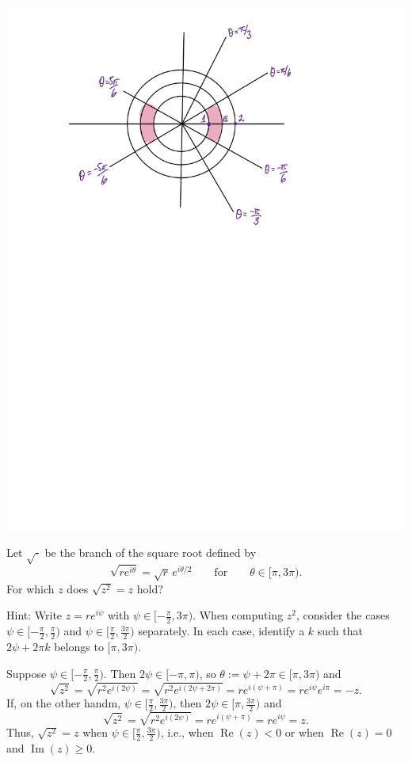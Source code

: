 \documentclass[12pt]{exam}
\renewcommand{\Re}{\operatorname{Re}}
\renewcommand{\Im}{\operatorname{Im}}
\begin{document}
\begin{questions}
\begin{parts}
\begin{solution}
            \includegraphics[scale=0.7]{c.pdf}
        \end{solution}
    \end{parts}
        
        
        
    \question[5]
    Let $\sqrt\cdot$ be the branch of the square root defined by
    \[
        \sqrt{re^{i\theta}} = \sqrt r\,e^{i\theta/2}\qquad\text{for}\qquad \theta\in [\pi, 3\pi).
    \]
    For which $z$ does $\sqrt{z^2}=z$ hold?
    
    Hint: Write $z=re^{i\psi}$ with $\psi\in[-\frac\pi2,3\pi)$. When computing $z^2$, consider the cases $\psi\in[-\frac\pi2,\frac\pi2)$ and $\psi\in[\frac\pi2,\frac{3\pi}2)$ separately.
    In each case, identify a $k$ such that $2\psi + 2\pi k$ belongs to $[\pi, 3\pi)$.

    \begin{solution}
        Suppose $\psi\in[-\frac\pi2,\frac\pi2)$.
        Then $2\psi\in[-\pi, \pi)$, so $\theta := \psi + 2\pi\in [\pi, 3\pi)$ and
        \[
            \sqrt{z^2} = \sqrt{r^2e^{i(2\psi)}} = \sqrt{r^2e^{i(2\psi+2\pi)}}=re^{i(\psi + \pi)}=re^{i\psi}e^{i\pi}=-z.
        \]
        If, on the other handm, $\psi\in[\frac\pi2,\frac{3\pi}2)$, then $2\psi\in [\pi, \frac{3\pi}2)$ and
        \[
            \sqrt{z^2} = \sqrt{r^2e^{i(2\psi)}} =re^{i(\psi + \pi)}=re^{i\psi}=z.
        \]
        Thus, $\sqrt{z^2}=z$ when $\psi\in [\frac\pi2,\frac{3\pi}2)$, i.e., when $\Re(z)<0$ or when $\Re(z)=0$ and $\Im(z)\geq 0$.
    \end{solution}
\end{questions}
\end{document}
